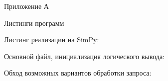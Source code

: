 \newpage\centerline{Приложение А}
\centerline{Листинги программ}

Листинг реализации на SimPy:


Основной файл, инициализация логического вывода:


Обход возможных вариантов обработки запроса:


